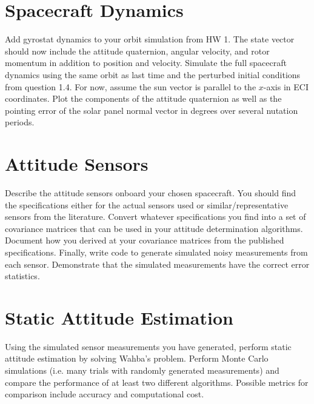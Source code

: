 \documentclass[11pt,letterpaper]{article}
\begin{document}
\section{Spacecraft Dynamics}

Add gyrostat dynamics to your orbit simulation from HW 1. The state vector should now include the attitude quaternion, angular velocity, and rotor momentum in addition to position and velocity. Simulate the full spacecraft dynamics using the same orbit as last time and the perturbed initial conditions from question 1.4. For now, assume the sun vector is parallel to the $x$-axis in ECI coordinates. Plot the components of the attitude quaternion as well as the pointing error of the solar panel normal vector in degrees over several nutation periods.

\section{Attitude Sensors}

Describe the attitude sensors onboard your chosen spacecraft. You should find the specifications either for the actual sensors used or similar/representative sensors from the literature. Convert whatever specifications you find into a set of covariance matrices that can be used in your attitude determination algorithms. Document how you derived at your covariance matrices from the published specifications. Finally, write code to generate simulated noisy measurements from each sensor. Demonstrate that the simulated measurements have the correct error statistics.

\section{Static Attitude Estimation}

Using the simulated sensor measurements you have generated, perform static attitude estimation by solving Wahba's problem. Perform Monte Carlo simulations (i.e. many trials with randomly generated measurements) and compare the performance of at least two different algorithms. Possible metrics for comparison include accuracy and computational cost.
\end{document}
